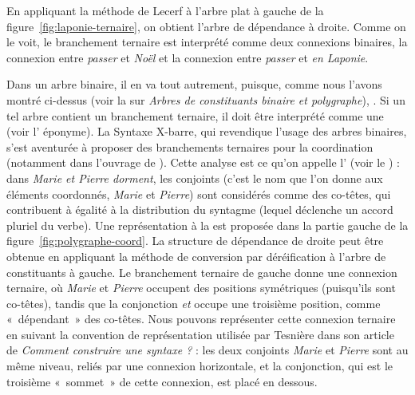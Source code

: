{    En appliquant la méthode de Lecerf à l’arbre plat à gauche de la figure~\ref{fig:laponie-ternaire}, on obtient l’arbre de dépendance à droite. Comme on le voit, le branchement ternaire est interprété comme deux connexions binaires, la connexion entre \textit{passer} et \textit{Noël} et la connexion entre \textit{passer} et \textit{en Laponie}.

    Dans un arbre binaire, il en va tout autrement, puisque, comme nous l’avons montré ci-dessus (voir la  sur \textit{Arbres de constituants binaire et polygraphe}), . Si un tel arbre contient un branchement ternaire, il doit être interprété comme une  (voir l’ éponyme). La Syntaxe X-barre, qui revendique l’usage des arbres binaires, s’est aventurée à proposer des branchements ternaires pour la coordination (notamment dans l'ouvrage de \citealt{jackendoff1977x}). Cette analyse est ce qu’on appelle l’ (voir le ) : dans \textit{Marie et Pierre dorment}, les conjoints (c’est le nom que l’on donne aux éléments coordonnés, \textit{Marie} et \textit{Pierre}) sont considérés comme des co-têtes, qui contribuent à égalité à la distribution du syntagme (lequel déclenche un accord pluriel du verbe). Une représentation à la \citet{jackendoff1977x} est proposée dans la partie gauche de la figure~\ref{fig:polygraphe-coord}. La structure de dépendance de droite peut être obtenue en appliquant la méthode de conversion par déréification à l’arbre de constituants à gauche. Le branchement ternaire de gauche donne une connexion ternaire, où \textit{Marie} et \textit{Pierre} occupent des positions symétriques (puisqu’ils sont co-têtes), tandis que la conjonction \textit{et} occupe une troisième position, comme «~dépendant~» des co-têtes. Nous pouvons représenter cette connexion ternaire en suivant la convention de représentation utilisée par Tesnière dans son article de \citeyear{tesniere1934comment} \textit{Comment construire une syntaxe ?} : les deux conjoints \textit{Marie} et \textit{Pierre} sont au même niveau, reliés par une connexion horizontale, et la conjonction, qui est le troisième «~sommet~» de cette connexion, est placé en dessous.

}
